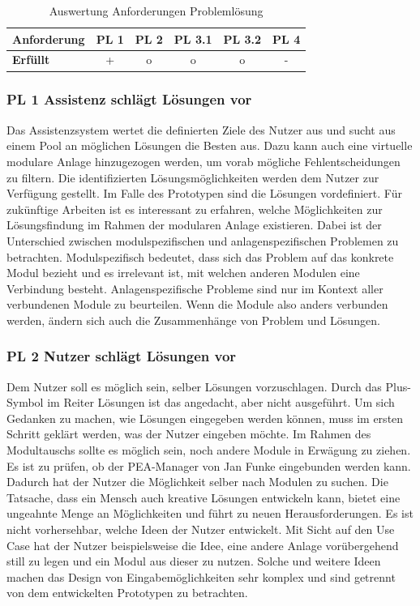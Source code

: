 \begin{table}[htb]
\caption{Auswertung Anforderungen Problemlösung}
\centering
\begin{tabular}{l|c|c|c|c|c}
\textbf{Anforderung} & PL 1 & PL 2 & PL 3.1 & PL 3.2 & PL 4 \\
\hline
\textbf{Erfüllt} & + & o & o & o & - \\
\end{tabular}
\label{tab:Anforderungen-Problemlösung}
\end{table}

\subsubsection*{PL 1 Assistenz schlägt Lösungen vor}
Das Assistenzsystem wertet die definierten Ziele des Nutzer aus und sucht aus einem Pool an möglichen Lösungen die Besten aus. Dazu kann auch eine virtuelle modulare Anlage hinzugezogen werden, um vorab mögliche Fehlentscheidungen zu filtern. Die identifizierten Lösungsmöglichkeiten werden dem Nutzer zur Verfügung gestellt. Im Falle des Prototypen sind die Lösungen vordefiniert. Für zukünftige Arbeiten ist es interessant zu erfahren, welche Möglichkeiten zur Lösungsfindung im Rahmen der modularen Anlage existieren. Dabei ist der Unterschied zwischen modulspezifischen und anlagenspezifischen Problemen zu betrachten. Modulspezifisch bedeutet, dass sich das Problem auf das konkrete Modul bezieht und es irrelevant ist, mit welchen anderen Modulen eine Verbindung besteht. Anlagenspezifische Probleme sind nur im Kontext aller verbundenen Module zu beurteilen. Wenn die Module also anders verbunden werden, ändern sich auch die Zusammenhänge von Problem und Lösungen.

\subsubsection*{PL 2 Nutzer schlägt Lösungen vor}
Dem Nutzer soll es möglich sein, selber Lösungen vorzuschlagen. Durch das Plus-Symbol im Reiter Lösungen ist das angedacht, aber nicht ausgeführt. Um sich Gedanken zu machen, wie Lösungen eingegeben werden können, muss im ersten Schritt geklärt werden, was der Nutzer eingeben möchte. Im Rahmen des Modultauschs sollte es möglich sein, noch andere Module in Erwägung zu ziehen. Es ist zu prüfen, ob der PEA-Manager von Jan Funke \cite{Funke2018} eingebunden werden kann. Dadurch hat der Nutzer die Möglichkeit selber nach Modulen zu suchen. Die Tatsache, dass ein Mensch auch kreative Lösungen entwickeln kann, bietet eine ungeahnte Menge an Möglichkeiten und führt zu neuen Herausforderungen. Es ist nicht vorhersehbar, welche Ideen der Nutzer entwickelt. Mit Sicht auf den Use Case hat der Nutzer beispielsweise die Idee, eine andere Anlage vorübergehend still zu legen und ein Modul aus dieser zu nutzen. Solche und weitere Ideen machen das Design von Eingabemöglichkeiten sehr komplex und sind getrennt von dem entwickelten Prototypen zu betrachten.

